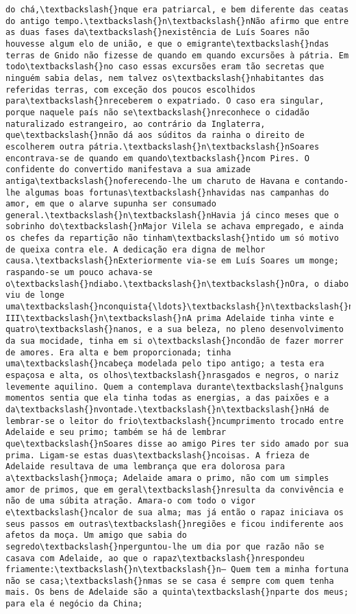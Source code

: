 \begin{Verbatim}[commandchars=\\\{\}]
do chá,\textbackslash{}nque era patriarcal, e bem diferente das ceatas do antigo tempo.\textbackslash{}n\textbackslash{}nNão afirmo que entre as duas fases da\textbackslash{}nexistência de Luís Soares não houvesse algum elo de união, e que o emigrante\textbackslash{}ndas terras de Gnido não fizesse de quando em quando excursões à pátria. Em todo\textbackslash{}no caso essas excursões eram tão secretas que ninguém sabia delas, nem talvez os\textbackslash{}nhabitantes das referidas terras, com exceção dos poucos escolhidos para\textbackslash{}nreceberem o expatriado. O caso era singular, porque naquele país não se\textbackslash{}nreconhece o cidadão naturalizado estrangeiro, ao contrário da Inglaterra, que\textbackslash{}nnão dá aos súditos da rainha o direito de escolherem outra pátria.\textbackslash{}n\textbackslash{}nSoares encontrava-se de quando em quando\textbackslash{}ncom Pires. O confidente do convertido manifestava a sua amizade antiga\textbackslash{}noferecendo-lhe um charuto de Havana e contando-lhe algumas boas fortunas\textbackslash{}nhavidas nas campanhas do amor, em que o alarve supunha ser consumado general.\textbackslash{}n\textbackslash{}nHavia já cinco meses que o sobrinho do\textbackslash{}nMajor Vilela se achava empregado, e ainda os chefes da repartição não tinham\textbackslash{}ntido um só motivo de queixa contra ele. A dedicação era digna de melhor causa.\textbackslash{}nExteriormente via-se em Luís Soares um monge; raspando-se um pouco achava-se o\textbackslash{}ndiabo.\textbackslash{}n\textbackslash{}nOra, o diabo viu de longe uma\textbackslash{}nconquista{\ldots}\textbackslash{}n\textbackslash{}nCAPÍTULO III\textbackslash{}n\textbackslash{}nA prima Adelaide tinha vinte e quatro\textbackslash{}nanos, e a sua beleza, no pleno desenvolvimento da sua mocidade, tinha em si o\textbackslash{}ncondão de fazer morrer de amores. Era alta e bem proporcionada; tinha uma\textbackslash{}ncabeça modelada pelo tipo antigo; a testa era espaçosa e alta, os olhos\textbackslash{}nrasgados e negros, o nariz levemente aquilino. Quem a contemplava durante\textbackslash{}nalguns momentos sentia que ela tinha todas as energias, a das paixões e a da\textbackslash{}nvontade.\textbackslash{}n\textbackslash{}nHá de lembrar-se o leitor do frio\textbackslash{}ncumprimento trocado entre Adelaide e seu primo; também se há de lembrar que\textbackslash{}nSoares disse ao amigo Pires ter sido amado por sua prima. Ligam-se estas duas\textbackslash{}ncoisas. A frieza de Adelaide resultava de uma lembrança que era dolorosa para a\textbackslash{}nmoça; Adelaide amara o primo, não com um simples amor de primos, que em geral\textbackslash{}nresulta da convivência e não de uma súbita atração. Amara-o com todo o vigor e\textbackslash{}ncalor de sua alma; mas já então o rapaz iniciava os seus passos em outras\textbackslash{}nregiões e ficou indiferente aos afetos da moça. Um amigo que sabia do segredo\textbackslash{}nperguntou-lhe um dia por que razão não se casava com Adelaide, ao que o rapaz\textbackslash{}nrespondeu friamente:\textbackslash{}n\textbackslash{}n— Quem tem a minha fortuna não se casa;\textbackslash{}nmas se se casa é sempre com quem tenha mais. Os bens de Adelaide são a quinta\textbackslash{}nparte dos meus; para ela é negócio da China; 
\end{Verbatim}
